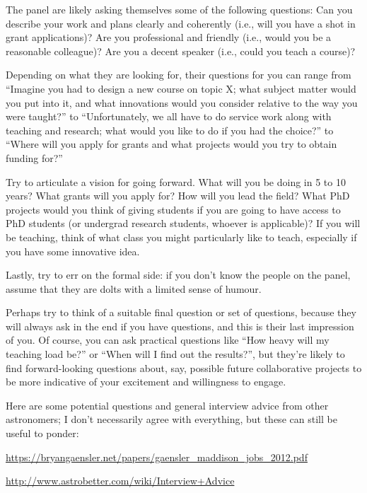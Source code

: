 \documentclass[onecolumn]{aastex7}
\begin{document}
The panel are likely asking themselves some of the following questions: Can you describe your work and plans clearly and coherently (i.e., will you have a shot in grant applications)? Are you professional and friendly (i.e., would you be a reasonable colleague)? Are you a decent speaker (i.e., could you teach a course)?

Depending on what they are looking for, their questions for you can range from ``Imagine you had to design a new course on topic X; what subject matter would you put into it, and what innovations would you consider relative to the way you were taught?'' to ``Unfortunately, we all have to do service work along with teaching and research; what would you like to do if you had the choice?'' to ``Where will you apply for grants and what projects would you try to obtain funding for?''

Try to articulate a vision for going forward. What will you be doing in 5 to 10 years? What grants will you apply for? How will you lead the field? What PhD projects would you think of giving students if you are going to have access to PhD students (or undergrad research students, whoever is applicable)? If you will be teaching, think of what class you might particularly like to teach, especially if you have some innovative idea.

Lastly, try to err on the formal side: if you don’t know the people on the panel, assume that they are dolts with a limited sense of humour. 

Perhaps try to think of a suitable final question or set of questions, because they will always ask in the end if you have questions, and this is their last impression of you. Of course, you can ask practical questions like ``How heavy will my teaching load be?'' or ``When will I find out the results?'', but they’re likely to find forward-looking questions about, say, possible future collaborative projects to be more indicative of your excitement and willingness to engage.

Here are some potential questions and general interview advice from other astronomers; I don’t necessarily agree with everything, but these can still be useful to ponder:

\url{https://bryangaensler.net/papers/gaensler_maddison_jobs_2012.pdf}

\url{http://www.astrobetter.com/wiki/Interview+Advice}
\end{document}
